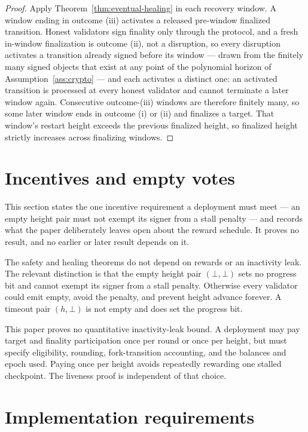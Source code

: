 \begin{proof}
Apply Theorem~\ref{thm:eventual-healing} in each recovery window.  A
window ending in outcome (iii) activates a released pre-window
finalized transition.  Honest validators sign finality only through the
protocol, and a fresh in-window finalization is outcome (ii), not a
disruption, so every disruption activates a transition already signed
before its window --- drawn from the finitely many signed objects that
exist at any point of the polynomial horizon of
Assumption~\ref{ass:crypto} --- and each activates a distinct one: an
activated transition is processed at every honest validator and cannot
terminate a later window again.  Consecutive outcome-(iii) windows are
therefore finitely many, so some later window ends in outcome (i) or
(ii) and finalizes a target.  That window's restart height exceeds the
previous finalized height, so finalized height strictly increases
across finalizing windows.
\end{proof}

\section{Incentives and empty votes}\label{sec:incentives}

This section states the one incentive requirement a deployment must meet ---
an empty height pair must not exempt its signer from a stall penalty --- and
records what the paper deliberately leaves open about the reward schedule.  It
proves no result, and no earlier or later result depends on it.

The safety and healing theorems do not depend on rewards or an inactivity
leak.  The relevant distinction is that the empty height pair
\((\bot,\bot)\) sets no progress bit and cannot exempt its signer from a stall
penalty.  Otherwise every validator could emit empty, avoid the penalty, and
prevent height advance forever.  A timeout pair \((h,\bot)\) is not empty and
does set the progress bit.

This paper proves no quantitative inactivity-leak bound.  A deployment may
pay target and finality participation once per round or once per height, but
must specify eligibility, rounding, fork-transition accounting, and the
balances and epoch used.  Paying once per height avoids repeatedly rewarding
one stalled checkpoint.  The liveness proof is independent of that choice.

\section{Implementation requirements}\label{sec:refinement}

